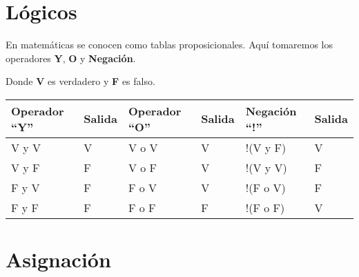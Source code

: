 \documentclass[
  11pt,
  a4paper,
  DIV=11,
  numbers=noendperiod]{scrreprt}
\begin{document}
\section{Lógicos}\label{luxf3gicos}

En matemáticas se conocen como tablas proposicionales. Aquí tomaremos
los operadores \textbf{Y}, \textbf{O} y \textbf{Negación}.

Donde \textbf{V} es verdadero y \textbf{F} es falso.

\begin{longtable}[]{@{}
  >{\centering\arraybackslash}p{}
  >{\centering\arraybackslash}p{}
  >{\centering\arraybackslash}p{}
  >{\centering\arraybackslash}p{}
  >{\centering\arraybackslash}p{}
  >{\centering\arraybackslash}p{}@{}}
\toprule\noalign{}
\begin{minipage}[b]{\linewidth}\centering
Operador ``Y''
\end{minipage} & \begin{minipage}[b]{\linewidth}\centering
Salida
\end{minipage} & \begin{minipage}[b]{\linewidth}\centering
Operador ``O''
\end{minipage} & \begin{minipage}[b]{\linewidth}\centering
Salida
\end{minipage} & \begin{minipage}[b]{\linewidth}\centering
Negación ``!''
\end{minipage} & \begin{minipage}[b]{\linewidth}\centering
Salida
\end{minipage} \\
\midrule\noalign{}
\endhead
\bottomrule\noalign{}
\endlastfoot
V y V & V & V o V & V & !(V y F) & V \\
V y F & F & V o F & V & !(V y V) & F \\
F y V & F & F o V & V & !(F o V) & F \\
F y F & F & F o F & F & !(F o F) & V \\
\end{longtable}

\section{Asignación}\label{asignaciuxf3n}
\end{document}
